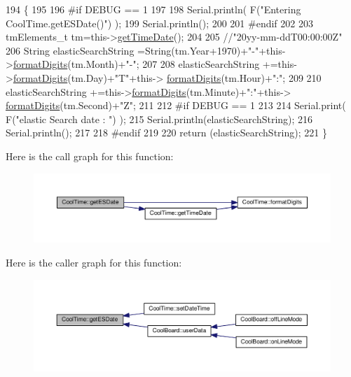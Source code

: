 \begin{DoxyCode}
194 \{
195 
196 \textcolor{preprocessor}{#if DEBUG == 1 }
197 
198     Serial.println( F(\textcolor{stringliteral}{"Entering CoolTime.getESDate()"}) );
199     Serial.println();
200 
201 \textcolor{preprocessor}{#endif }
202 
203     tmElements\_t tm=this->\hyperlink{classCoolTime_a7a7501c5ca77dd1248bea704c44f986c}{getTimeDate}();
204 
205     \textcolor{comment}{//"20yy-mm-ddT00:00:00Z"}
206     String elasticSearchString =String(tm.Year+1970)+\textcolor{stringliteral}{"-"}+this->\hyperlink{classCoolTime_acd537cd4210d7bde4e1f5c47d2ac0456}{formatDigits}(tm.Month)+\textcolor{stringliteral}{"-"};
207 
208     elasticSearchString +=this->\hyperlink{classCoolTime_acd537cd4210d7bde4e1f5c47d2ac0456}{formatDigits}(tm.Day)+\textcolor{stringliteral}{"T"}+this->
      \hyperlink{classCoolTime_acd537cd4210d7bde4e1f5c47d2ac0456}{formatDigits}(tm.Hour)+\textcolor{stringliteral}{":"};
209     
210     elasticSearchString +=this->\hyperlink{classCoolTime_acd537cd4210d7bde4e1f5c47d2ac0456}{formatDigits}(tm.Minute)+\textcolor{stringliteral}{":"}+this->
      \hyperlink{classCoolTime_acd537cd4210d7bde4e1f5c47d2ac0456}{formatDigits}(tm.Second)+\textcolor{stringliteral}{"Z"};
211 
212 \textcolor{preprocessor}{#if DEBUG == 1 }
213 
214     Serial.print( F(\textcolor{stringliteral}{"elastic Search date : "}) );
215     Serial.println(elasticSearchString);
216     Serial.println();
217 
218 \textcolor{preprocessor}{#endif}
219 
220     \textcolor{keywordflow}{return} (elasticSearchString);
221 \}
\end{DoxyCode}
Here is the call graph for this function\+:
\nopagebreak
\begin{figure}[H]
\begin{center}
\leavevmode
\includegraphics[width=350pt]{classCoolTime_ac4f32ee513c1328d984306645e8785a4_cgraph}
\end{center}
\end{figure}
Here is the caller graph for this function\+:
\nopagebreak
\begin{figure}[H]
\begin{center}
\leavevmode
\includegraphics[width=350pt]{classCoolTime_ac4f32ee513c1328d984306645e8785a4_icgraph}
\end{center}
\end{figure}
\mbox{\label{classCoolTime_a5d17f707a9d337720493b2bce9d41c21}} 
